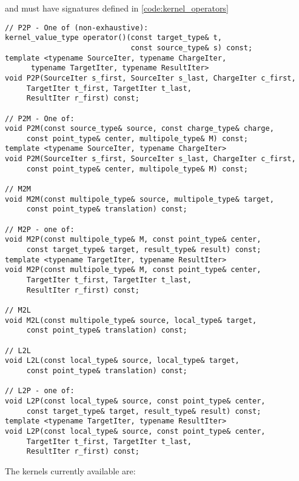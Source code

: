 \noindent
and must have signatures defined in \ref{code:kernel_operators}

\begin{figure*}
\begin{lstlisting}
// P2P - One of (non-exhaustive):
kernel_value_type operator()(const target_type& t,
                             const source_type& s) const;
template <typename SourceIter, typename ChargeIter,
	  typename TargetIter, typename ResultIter>
void P2P(SourceIter s_first, SourceIter s_last, ChargeIter c_first,
	 TargetIter t_first, TargetIter t_last,
	 ResultIter r_first) const;

// P2M - One of:
void P2M(const source_type& source, const charge_type& charge,
	 const point_type& center, multipole_type& M) const;
template <typename SourceIter, typename ChargeIter>
void P2M(SourceIter s_first, SourceIter s_last, ChargeIter c_first,
	 const point_type& center, multipole_type& M) const;

// M2M
void M2M(const multipole_type& source, multipole_type& target,
	 const point_type& translation) const;

// M2P - one of:
void M2P(const multipole_type& M, const point_type& center,
	 const target_type& target, result_type& result) const;
template <typename TargetIter, typename ResultIter>
void M2P(const multipole_type& M, const point_type& center,
	 TargetIter t_first, TargetIter t_last,
	 ResultIter r_first) const;
	 
// M2L
void M2L(const multipole_type& source, local_type& target,
	 const point_type& translation) const;

// L2L
void L2L(const local_type& source, local_type& target,
	 const point_type& translation) const;

// L2P - one of:
void L2P(const local_type& source, const point_type& center,
	 const target_type& target, result_type& result) const;
template <typename TargetIter, typename ResultIter>
void L2P(const local_type& source, const point_type& center,
	 TargetIter t_first, TargetIter t_last,
	 ResultIter r_first) const;
\end{lstlisting}
\caption{Kernel operators}
\label{code:kernel_operators}
\end{figure*}

\noindent
The kernels currently available are:


